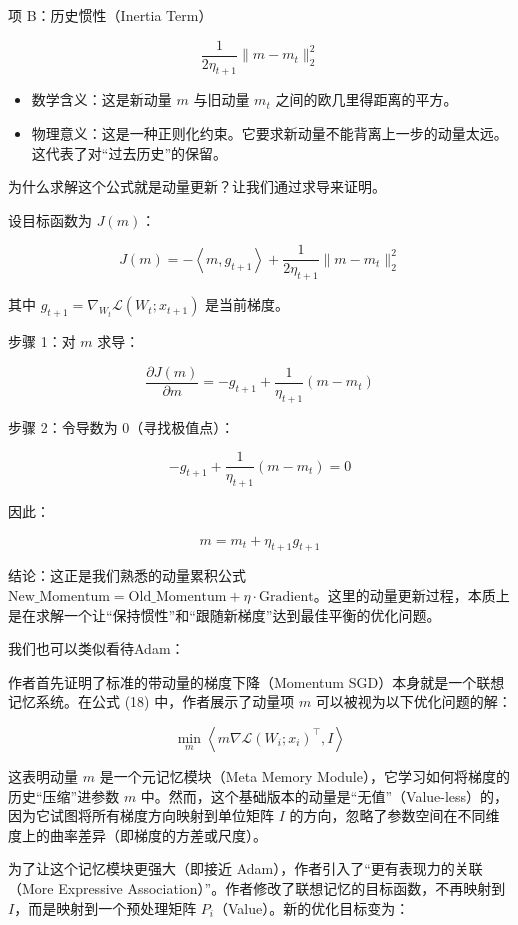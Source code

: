 项 B：历史惯性（Inertia Term）

\[
\frac{1}{2\eta_{t+1}}\lVert m-m_t\rVert_2^2
\]

\begin{itemize}
\tightlist
\item
  数学含义：这是新动量 \(m\) 与旧动量 \(m_t\) 之间的欧几里得距离的平方。
\item
  物理意义：这是一种正则化约束。它要求新动量不能背离上一步的动量太远。这代表了对``过去历史''的保留。
\end{itemize}

为什么求解这个公式就是动量更新？让我们通过求导来证明。

设目标函数为 \(J(m)\)：

\[
J(m)=-\left\langle m,g_{t+1}\right\rangle+\frac{1}{2\eta_{t+1}}\lVert m-m_t\rVert_2^2
\]

其中 \(g_{t+1}=\nabla_{W_t}\mathcal{L}(W_t;x_{t+1})\) 是当前梯度。

步骤 1：对 \(m\) 求导：

\[
\frac{\partial J(m)}{\partial m}=-g_{t+1}+\frac{1}{\eta_{t+1}}(m-m_t)
\]

步骤 2：令导数为 0（寻找极值点）：

\[
- g_{t+1}+\frac{1}{\eta_{t+1}}(m-m_t)=0
\]

因此：

\[
m=m_t+\eta_{t+1}g_{t+1}
\]

结论：这正是我们熟悉的动量累积公式 \(\mathrm{New\_Momentum}=\mathrm{Old\_Momentum}+\eta\cdot\mathrm{Gradient}\)。这里的动量更新过程，本质上是在求解一个让``保持惯性''和``跟随新梯度''达到最佳平衡的优化问题。

我们也可以类似看待Adam：

作者首先证明了标准的带动量的梯度下降（Momentum SGD）本身就是一个联想记忆系统。在公式 (18) 中，作者展示了动量项 \(m\) 可以被视为以下优化问题的解：

\[
\min_m\left\langle m\nabla\mathcal{L}(W_i;x_i)^\top,I\right\rangle
\]

这表明动量 \(m\) 是一个元记忆模块（Meta Memory Module），它学习如何将梯度的历史``压缩''进参数 \(m\) 中。然而，这个基础版本的动量是``无值''（Value-less）的，因为它试图将所有梯度方向映射到单位矩阵 \(I\) 的方向，忽略了参数空间在不同维度上的曲率差异（即梯度的方差或尺度）。

为了让这个记忆模块更强大（即接近 Adam），作者引入了``更有表现力的关联（More Expressive Association）''。作者修改了联想记忆的目标函数，不再映射到 \(I\)，而是映射到一个预处理矩阵 \(P_i\)（Value）。新的优化目标变为：

